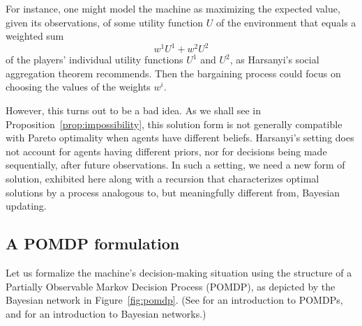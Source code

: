 \documentclass{article}  %
\newcommand{\bred}[1]{{\color{red}{#1}}}
\newcommand{\fig}[1]{Figure~\ref{fig:#1}}
\newcommand{\prop}[1]{Proposition~\ref{prop:#1}}
\begin{document}
For instance, one might model the machine as maximizing the expected value, given its observations, of some utility function $U$ of the environment that equals a weighted sum 
\begin{equation}\label{eqn:harsanyi}
w^1U^1 + w^2U^2
\end{equation}
of the players' individual utility functions $U^1$ and $U^2$, as Harsanyi's social aggregation theorem \cite{Har55} recommends.  Then the bargaining process could focus on choosing the values of the weights $w^i$.  

However, this turns out to be a bad idea.  As we shall see in \prop{impossibility}, this solution form is not generally compatible with Pareto optimality when agents have different beliefs.  Harsanyi's setting does not account for agents having different priors, nor for decisions being made sequentially, after future observations.  In such a setting, we need a new form of solution, exhibited here along with a recursion that characterizes optimal solutions by a process analogous to, but meaningfully different from, Bayesian updating.

\subsection{A POMDP formulation}

Let us formalize the machine's decision-making situation using the structure of a Partially Observable Markov Decision Process (POMDP), as depicted by the Bayesian network in \fig{pomdp}.  (See \cite{RN03} for an introduction to POMDPs, and \cite{Da09} for an introduction to Bayesian networks.)
\end{document}
